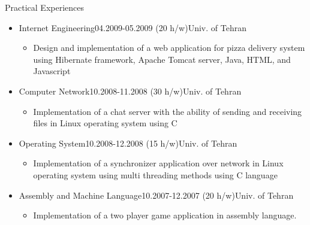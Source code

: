 \documentclass{resume} %
\begin{document}
\begin{rSection}{Practical Experiences}
\begin{itemize}
\item{
\begin{rSubsection}{Internet Engineering}{04.2009-05.2009 (20 h/w)}{Univ. of Tehran}{}
	\begin{itemize}
		\item{Design and implementation of a web application for pizza delivery system using Hibernate framework, Apache Tomcat server, Java, HTML, and Javascript}
	\end{itemize}
\end{rSubsection}}

\item{
\begin{rSubsection}{Computer Network}{10.2008-11.2008 (30 h/w)}{Univ. of Tehran}{}
	\begin{itemize}
		\item{Implementation of a chat server with the ability of sending and receiving files in Linux operating system using C}
	\end{itemize}
\end{rSubsection}}


\item{
\begin{rSubsection}{Operating System}{10.2008-12.2008 (15 h/w)}{Univ. of Tehran}{}
	\begin{itemize}
		\item{Implementation of a synchronizer application over network in Linux operating system using multi threading methods using C language}
	\end{itemize}
\end{rSubsection}}



\item{
\begin{rSubsection}{Assembly and Machine Language}{10.2007-12.2007 (20 h/w)}{Univ. of Tehran}{}
	\begin{itemize}
		\item{Implementation of a two player game application in assembly language.}
    \end{itemize}
\end{rSubsection}

}
\end{itemize}
\end{rSection}
\end{document}

